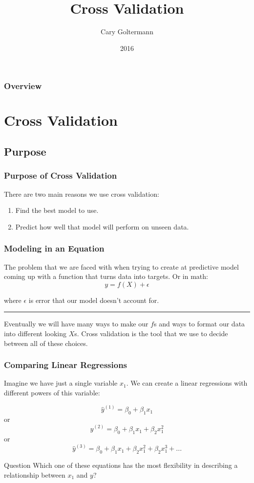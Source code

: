 \documentclass{beamer}
\title{Cross Validation}
\author{Cary Goltermann}
\institute{Galvanize}
\date{2016}
\begin{document}
\frame{\titlepage}

\begin{frame}
  \frametitle{Overview}
  \tableofcontents[]
\end{frame}

\section{Cross Validation}
\subsection{Purpose}
\begin{frame}
  \frametitle{Purpose of Cross Validation}
  {\large There are two main reasons we use cross validation:} \vspace{4mm}
  \begin{enumerate}
    \item Find the best model to use. \pause
    \item Predict how well that model will perform on unseen data.
  \end{enumerate}
\end{frame}

\begin{frame}
  \frametitle{Modeling in an Equation}
  The problem that we are faced with when trying to create at predictive model coming up with a function that turns data into targets. Or in math:
  $$ y = f(X) + \epsilon $$

  where $\epsilon$ is error that our model doesn't account for. \vspace{2mm} 

  \pause
  \noindent\hfil\rule{\textwidth}{.4pt}\hfil \vspace{3mm}

  Eventually we will have many ways to make our $f$s and ways to format our data into different looking $X$s. Cross validation is the tool that we use to decide between all of these choices.
 
\end{frame}

\begin{frame}
  \frametitle{Comparing Linear Regressions}
  Imagine we have just a single variable $x_1$. We can create a linear regressions with different powers of this variable:

  $$ \hat{y}^{(1)} = \beta_0 + \beta_1 x_1 $$
  or
  $$ \hat{y}^{(2)} = \beta_0 + \beta_1 x_1 + \beta_2 x_1^2 $$
  or
  $$ \hat{y}^{(3)} = \beta_0 + \beta_1 x_1 + \beta_2 x_1^2 + \beta_2 x_1^3 + ... $$ \pause
  \begin{block}{Question}
    Which one of these equations has the most flexibility in describing a relationship between $x_1$ and $y$?
  \end{block}
\end{frame}
\end{document}
